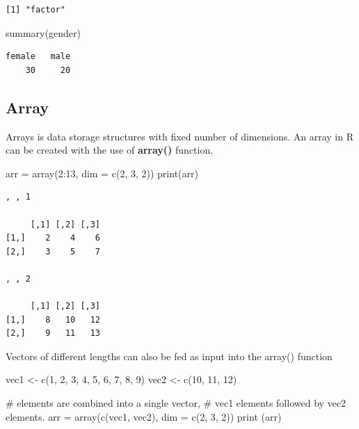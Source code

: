 \documentclass[
  letterpaper,
  DIV=11,
  numbers=noendperiod]{scrreprt}
\newenvironment{Shaded}{\begin{snugshade}}{\end{snugshade}}
\newcommand{\AttributeTok}[1]{\textcolor[rgb]{0.40,0.45,0.13}{#1}}
\newcommand{\CommentTok}[1]{\textcolor[rgb]{0.37,0.37,0.37}{#1}}
\newcommand{\DecValTok}[1]{\textcolor[rgb]{0.68,0.00,0.00}{#1}}
\newcommand{\FunctionTok}[1]{\textcolor[rgb]{0.28,0.35,0.67}{#1}}
\newcommand{\NormalTok}[1]{\textcolor[rgb]{0.00,0.23,0.31}{#1}}
\newcommand{\OtherTok}[1]{\textcolor[rgb]{0.00,0.23,0.31}{#1}}
\newcommand{\SpecialCharTok}[1]{\textcolor[rgb]{0.37,0.37,0.37}{#1}}
\begin{document}
\begin{verbatim}
[1] "factor"
\end{verbatim}

\begin{Shaded}
\begin{Highlighting}[]
\FunctionTok{summary}\NormalTok{(gender)}
\end{Highlighting}
\end{Shaded}

\begin{verbatim}
female   male 
    30     20 
\end{verbatim}

\hypertarget{array}{%
\subsection{Array}\label{array}}

Arrays is data storage structures with fixed number of dimensions. An
array in R can be created with the use of \textbf{array()} function.

\begin{Shaded}
\begin{Highlighting}[]
\NormalTok{arr }\OtherTok{=} \FunctionTok{array}\NormalTok{(}\DecValTok{2}\SpecialCharTok{:}\DecValTok{13}\NormalTok{, }\AttributeTok{dim =} \FunctionTok{c}\NormalTok{(}\DecValTok{2}\NormalTok{, }\DecValTok{3}\NormalTok{, }\DecValTok{2}\NormalTok{))}
\FunctionTok{print}\NormalTok{(arr)}
\end{Highlighting}
\end{Shaded}

\begin{verbatim}
, , 1

     [,1] [,2] [,3]
[1,]    2    4    6
[2,]    3    5    7

, , 2

     [,1] [,2] [,3]
[1,]    8   10   12
[2,]    9   11   13
\end{verbatim}

Vectors of different lengths can also be fed as input into the array()
function

\begin{Shaded}
\begin{Highlighting}[]
\NormalTok{vec1 }\OtherTok{\textless{}{-}} \FunctionTok{c}\NormalTok{(}\DecValTok{1}\NormalTok{, }\DecValTok{2}\NormalTok{, }\DecValTok{3}\NormalTok{, }\DecValTok{4}\NormalTok{, }\DecValTok{5}\NormalTok{, }\DecValTok{6}\NormalTok{, }\DecValTok{7}\NormalTok{, }\DecValTok{8}\NormalTok{, }\DecValTok{9}\NormalTok{)}
\NormalTok{vec2 }\OtherTok{\textless{}{-}} \FunctionTok{c}\NormalTok{(}\DecValTok{10}\NormalTok{, }\DecValTok{11}\NormalTok{, }\DecValTok{12}\NormalTok{)}
  
\CommentTok{\# elements are combined into a single vector, }
\CommentTok{\# vec1 elements followed by vec2 elements.}
\NormalTok{arr }\OtherTok{=} \FunctionTok{array}\NormalTok{(}\FunctionTok{c}\NormalTok{(vec1, vec2), }\AttributeTok{dim =} \FunctionTok{c}\NormalTok{(}\DecValTok{2}\NormalTok{, }\DecValTok{3}\NormalTok{, }\DecValTok{2}\NormalTok{))}
\FunctionTok{print}\NormalTok{ (arr)}
\end{Highlighting}
\end{Shaded}
\end{document}
